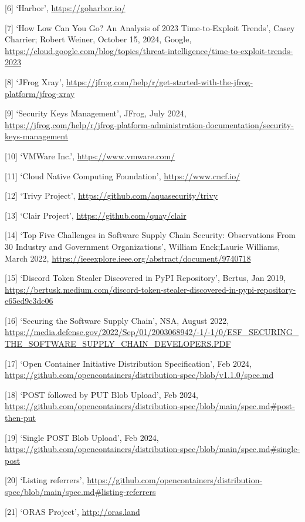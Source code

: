 \documentclass{article}
\begin{document}
  [6] `Harbor', \url{https://goharbor.io/}

  [7] `How Low Can You Go? An Analysis of 2023 Time-to-Exploit Trends', Casey Charrier; Robert Weiner, October 15, 2024, Google, \url{https://cloud.google.com/blog/topics/threat-intelligence/time-to-exploit-trends-2023}

  [8] `JFrog Xray', \url{https://jfrog.com/help/r/get-started-with-the-jfrog-platform/jfrog-xray}

  [9] `Security Keys Management', JFrog, July 2024, \url{https://jfrog.com/help/r/jfrog-platform-administration-documentation/security-keys-management}

  [10] `VMWare Inc.', \url{https://www.vmware.com/}

  [11] `Cloud Native Computing Foundation', \url{https://www.cncf.io/}

  [12] `Trivy Project', \url{https://github.com/aquasecurity/trivy}

  [13] `Clair Project', \url{https://github.com/quay/clair}
  
  [14] `Top Five Challenges in Software Supply Chain Security: Observations From 30 Industry and Government Organizations', William Enck;Laurie Williams, March 2022, \url{https://ieeexplore.ieee.org/abstract/document/9740718}

  [15] `Discord Token Stealer Discovered in PyPI Repository', Bertus, Jan 2019, \url{https://bertusk.medium.com/discord-token-stealer-discovered-in-pypi-repository-e65ed9c3de06}

  [16] `Securing the Software Supply Chain', NSA, August 2022, \url{https://media.defense.gov/2022/Sep/01/2003068942/-1/-1/0/ESF_SECURING_THE_SOFTWARE_SUPPLY_CHAIN_DEVELOPERS.PDF}

  [17] `Open Container Initiative Distribution Specification', Feb 2024, \url{https://github.com/opencontainers/distribution-spec/blob/v1.1.0/spec.md}

  [18] `POST followed by PUT Blob Upload', Feb 2024, \url{https://github.com/opencontainers/distribution-spec/blob/main/spec.md#post-then-put}

  [19] `Single POST Blob Upload', Feb 2024, \url{https://github.com/opencontainers/distribution-spec/blob/main/spec.md#single-post}

  [20] `Listing referrers', \url{https://github.com/opencontainers/distribution-spec/blob/main/spec.md#listing-referrers}

  [21] `ORAS Project', \url{http://oras.land}
\end{document}
